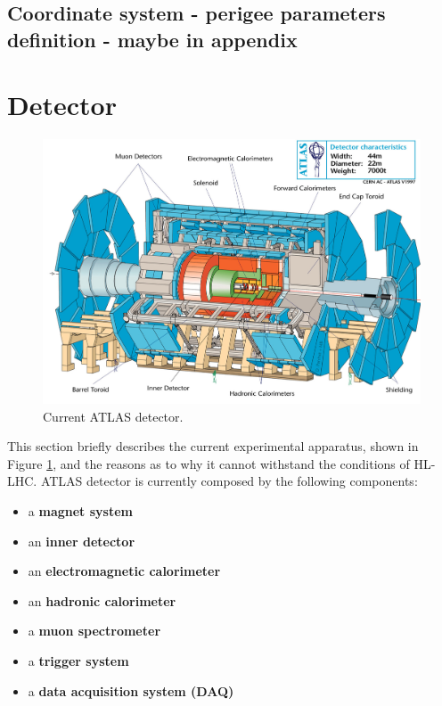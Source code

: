 \documentclass[a4paper,twoside,12pt]{article}
\begin{document}
\subsection{Coordinate system - perigee parameters definition - maybe in appendix}


\newpage

\section{Detector} \label{Detector}

\begin{figure} [h]
	\includegraphics[width=\textwidth]{atlasdet}
	\caption{Current ATLAS detector.}
	\label{fig:current_atlasdet}
\end{figure}

This section briefly describes the current experimental apparatus, shown in Figure \ref{fig:current_atlasdet}, and the reasons as to why it cannot withstand the conditions of HL-LHC.
\smallskip
ATLAS detector is currently composed by the following components:
\begin{itemize}
\item a \textbf{magnet system}
\item an \textbf{inner detector}
\item an \textbf{electromagnetic calorimeter}
\item an \textbf{hadronic calorimeter}
\item a \textbf{muon spectrometer}
\item a \textbf{trigger system}
\item a \textbf{data acquisition system (DAQ)}
\end{itemize}
\end{document}
